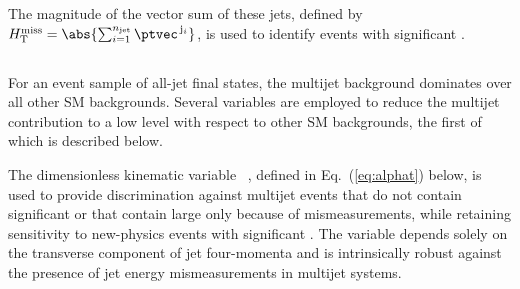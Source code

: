The magnitude of the vector \ptvec sum of these jets, defined by
$\HTmiss = \abs{\sum_{{i}=1}^{\njet} \ptvec^{\,\mathrm{j}_i}}$, is
used to identify events with significant \ptvecmiss.

%
%

\subsection{\texorpdfstring{\alphat}{AlphaT}}
\label{sec:alphatdef}

For an event sample of all-jet final states, the multijet background
dominates over all other SM backgrounds. Several variables are
employed to reduce the multijet contribution to a low level with
respect to other SM backgrounds, the first of which is described
below.

The dimensionless kinematic variable \alphat~\cite{Randall:2008rw,
  CMS:2008vya, CMS-PAS-SUS-09-001}, defined in Eq.~(\ref{eq:alphat})
below, is used to provide discrimination against multijet events that
do not contain significant \ptvecmiss or that contain large \ptvecmiss
only because of \pt mismeasurements, while retaining sensitivity to
new-physics events with significant \ptvecmiss. The \alphat variable
depends solely on the transverse component of jet four-momenta and is
intrinsically robust against the presence of jet energy
mismeasurements in multijet systems. 

